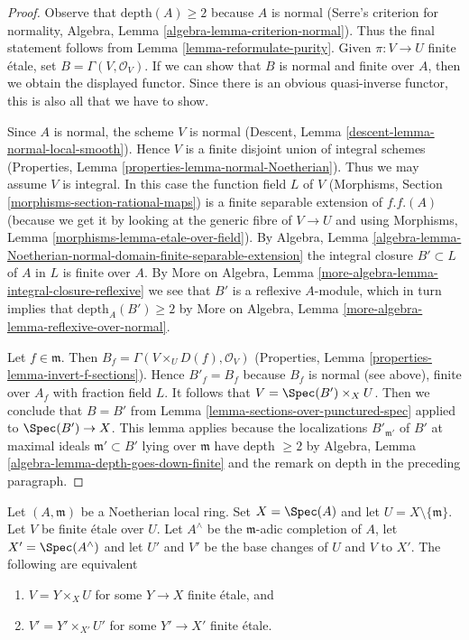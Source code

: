 \begin{proof}
Observe that $\text{depth}(A) \geq 2$ because $A$ is normal
(Serre's criterion for normality, Algebra, Lemma
\ref{algebra-lemma-criterion-normal}).
Thus the final statement follows from Lemma \ref{lemma-reformulate-purity}.
Given $\pi : V \to U$ finite \'etale, set $B = \Gamma(V, \mathcal{O}_V)$.
If we can show that $B$ is normal and finite over $A$, then
we obtain the displayed functor. Since there is an obvious
quasi-inverse functor, this is also all that we have to show.

\medskip\noindent
Since $A$ is normal, the scheme $V$ is normal
(Descent, Lemma \ref{descent-lemma-normal-local-smooth}).
Hence $V$ is a finite disjoint union of integral schemes
(Properties, Lemma \ref{properties-lemma-normal-Noetherian}).
Thus we may assume $V$ is integral.
In this case the function field $L$ of $V$
(Morphisms, Section \ref{morphisms-section-rational-maps})
is a finite separable extension of $f.f.(A)$
(because we get it by looking at the generic fibre
of $V \to U$ and using Morphisms, Lemma
\ref{morphisms-lemma-etale-over-field}).
By Algebra, Lemma
\ref{algebra-lemma-Noetherian-normal-domain-finite-separable-extension}
the integral closure $B' \subset L$ of $A$ in $L$ is finite over $A$.
By More on Algebra, Lemma \ref{more-algebra-lemma-integral-closure-reflexive}
we see that $B'$ is a reflexive $A$-module, which in turn implies
that $\text{depth}_A(B') \geq 2$ by
More on Algebra, Lemma \ref{more-algebra-lemma-reflexive-over-normal}.

\medskip\noindent
Let $f \in \mathfrak m$. Then $B_f = \Gamma(V \times_U D(f), \mathcal{O}_V)$
(Properties, Lemma \ref{properties-lemma-invert-f-sections}).
Hence $B'_f = B_f$ because $B_f$ is normal (see above),
finite over $A_f$ with fraction field $L$.
It follows that $V = \Spec(B') \times_X U$.
Then we conclude that $B = B'$ from
Lemma \ref{lemma-sections-over-punctured-spec}
applied to $\Spec(B') \to X$.
This lemma applies because the localizations $B'_{\mathfrak m'}$
of $B'$ at maximal ideals $\mathfrak m' \subset B'$ lying over
$\mathfrak m$ have depth $\geq 2$ by
Algebra, Lemma \ref{algebra-lemma-depth-goes-down-finite}
and the remark on depth in the preceding paragraph.
\end{proof}

\begin{lemma}
\label{lemma-purity-and-completion}
Let $(A, \mathfrak m)$ be a Noetherian local ring. Set $X = \Spec(A)$
and let $U = X \setminus \{\mathfrak m\}$.
Let $V$ be finite \'etale over $U$.
Let $A^\wedge$ be the $\mathfrak m$-adic completion of $A$,
let $X' = \Spec(A^\wedge)$ and let $U'$ and $V'$ be the base changes of
$U$ and $V$ to $X'$. The following are equivalent
\begin{enumerate}
\item $V = Y \times_X U$ for some $Y \to X$ finite \'etale, and
\item $V' = Y' \times_{X'} U'$ for some $Y' \to X'$ finite \'etale.
\end{enumerate}
\end{lemma}

